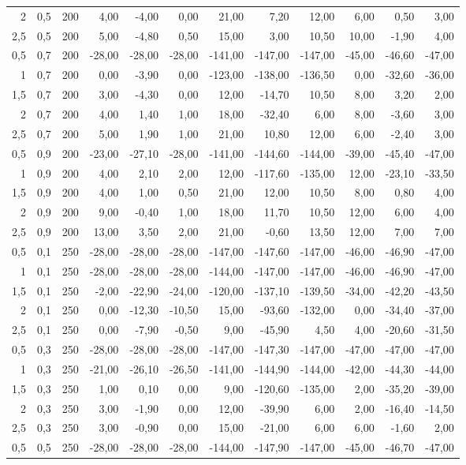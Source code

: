 \begin{table}[h]
\begin{tabular}{|r|r|r|r|r|r|r|r|r|r|r|r|}
2 & 0,5 & 200 & 4,00 & -4,00 & 0,00 & 21,00 & 7,20 & 12,00 & 6,00 & 0,50 & 3,00 \\
2,5 & 0,5 & 200 & 5,00 & -4,80 & 0,50 & 15,00 & 3,00 & 10,50 & 10,00 & -1,90 & 4,00 \\
0,5 & 0,7 & 200 & -28,00 & -28,00 & -28,00 & -141,00 & -147,00 & -147,00 & -45,00 & -46,60 & -47,00 \\
1 & 0,7 & 200 & 0,00 & -3,90 & 0,00 & -123,00 & -138,00 & -136,50 & 0,00 & -32,60 & -36,00 \\
1,5 & 0,7 & 200 & 3,00 & -4,30 & 0,00 & 12,00 & -14,70 & 10,50 & 8,00 & 3,20 & 2,00 \\
2 & 0,7 & 200 & 4,00 & 1,40 & 1,00 & 18,00 & -32,40 & 6,00 & 8,00 & -3,60 & 3,00 \\
2,5 & 0,7 & 200 & 5,00 & 1,90 & 1,00 & 21,00 & 10,80 & 12,00 & 6,00 & -2,40 & 3,00 \\
0,5 & 0,9 & 200 & -23,00 & -27,10 & -28,00 & -141,00 & -144,60 & -144,00 & -39,00 & -45,40 & -47,00 \\
1 & 0,9 & 200 & 4,00 & 2,10 & 2,00 & 12,00 & -117,60 & -135,00 & 12,00 & -23,10 & -33,50 \\
1,5 & 0,9 & 200 & 4,00 & 1,00 & 0,50 & 21,00 & 12,00 & 10,50 & 8,00 & 0,80 & 4,00 \\
2 & 0,9 & 200 & 9,00 & -0,40 & 1,00 & 18,00 & 11,70 & 10,50 & 12,00 & 6,00 & 4,00 \\
2,5 & 0,9 & 200 & 13,00 & 3,50 & 2,00 & 21,00 & -0,60 & 13,50 & 12,00 & 7,00 & 7,00 \\
0,5 & 0,1 & 250 & -28,00 & -28,00 & -28,00 & -147,00 & -147,60 & -147,00 & -46,00 & -46,90 & -47,00 \\
1 & 0,1 & 250 & -28,00 & -28,00 & -28,00 & -144,00 & -147,00 & -147,00 & -46,00 & -46,90 & -47,00 \\
1,5 & 0,1 & 250 & -2,00 & -22,90 & -24,00 & -120,00 & -137,10 & -139,50 & -34,00 & -42,20 & -43,50 \\
2 & 0,1 & 250 & 0,00 & -12,30 & -10,50 & 15,00 & -93,60 & -132,00 & 0,00 & -34,40 & -37,00 \\
2,5 & 0,1 & 250 & 0,00 & -7,90 & -0,50 & 9,00 & -45,90 & 4,50 & 4,00 & -20,60 & -31,50 \\
0,5 & 0,3 & 250 & -28,00 & -28,00 & -28,00 & -147,00 & -147,30 & -147,00 & -47,00 & -47,00 & -47,00 \\
1 & 0,3 & 250 & -21,00 & -26,10 & -26,50 & -141,00 & -144,90 & -144,00 & -42,00 & -44,30 & -44,00 \\
1,5 & 0,3 & 250 & 1,00 & 0,10 & 0,00 & 9,00 & -120,60 & -135,00 & 2,00 & -35,20 & -39,00 \\
2 & 0,3 & 250 & 3,00 & -1,90 & 0,00 & 12,00 & -39,90 & 6,00 & 2,00 & -16,40 & -14,50 \\
2,5 & 0,3 & 250 & 3,00 & -0,90 & 0,00 & 15,00 & -21,00 & 6,00 & 6,00 & -1,60 & 2,00 \\
0,5 & 0,5 & 250 & -28,00 & -28,00 & -28,00 & -144,00 & -147,90 & -147,00 & -45,00 & -46,70 & -47,00 \\
\hline
\end{tabular}
\end{table}

